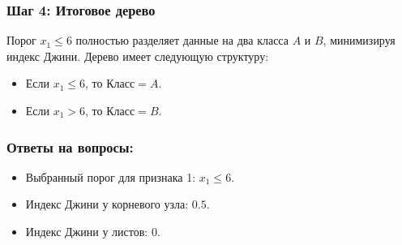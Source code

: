 \begin{solution}
\subsubsection*{Шаг 4: Итоговое дерево}

Порог $x_1 \leq 6$ полностью разделяет данные на два класса $A$ и $B$, минимизируя индекс Джини. Дерево имеет следующую структуру:

\begin{itemize}
    \item Если $x_1 \leq 6$, то $Класс = A$.
    \item Если $x_1 > 6$, то $Класс = B$.
\end{itemize}

\subsubsection*{Ответы на вопросы:}

\begin{itemize}
    \item Выбранный порог для признака 1: $x_1 \leq 6$.
    \item Индекс Джини у корневого узла: $0.5$.
    \item Индекс Джини у листов: $0$.
\end{itemize}
\end{solution}
